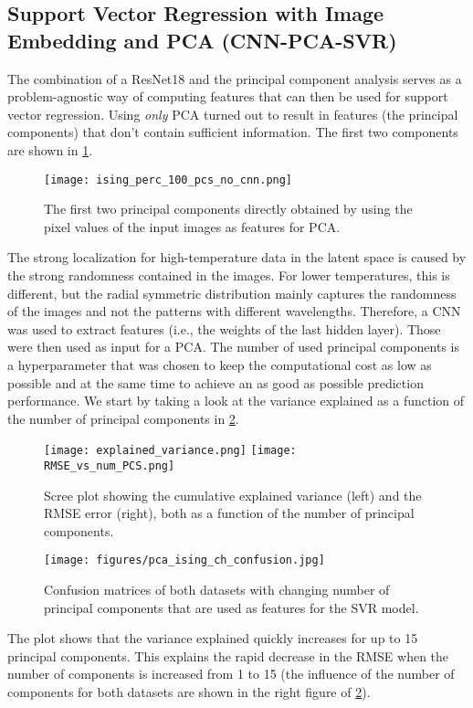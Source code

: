 \documentclass[11pt, authoryear]{elsarticle}
\begin{document}
\begin{appendix}
		\subsection{Support Vector Regression with Image Embedding and PCA (CNN-PCA-SVR)}
		The combination of a ResNet18 and the principal component analysis serves as a
		problem-agnostic way of computing features that can then be used for support 
		vector regression. Using \emph{only} PCA turned out to result in features
		(the principal components) that don't contain sufficient information. The
		first two components are shown in \cref{fig:ising_pcs_no_cnn}.
		\begin{figure}
			\centering
			\texttt{[image: ising\_perc\_100\_pcs\_no\_cnn.png]}
			\caption[]{%
				The first two principal components directly obtained by using the pixel values
				of the input images as features for PCA. 
			}
			\label{fig:ising_pcs_no_cnn}
		\end{figure}
		The strong localization for high-temperature data in the latent space
		is caused by the strong randomness contained in the images. For lower
		temperatures, this is different, but the radial symmetric distribution
		mainly captures the randomness of the images and not the patterns
		with different wavelengths. Therefore, a CNN was used to extract
		features (i.e., the weights of the last hidden layer). Those were
		then used as input for a PCA. The number of used principal components 
		is a hyperparameter that was chosen to keep the
		computational cost as low as possible and at the same time to achieve an 
		as good as possible prediction performance. We start by taking a look at the 
		variance explained as a function of the number of principal components in
		\cref{fig:exp_var}. 
		\begin{figure}
			\hbox{}\hfill
			\texttt{[image: explained\_variance.png]}
			\hfill
			\texttt{[image: RMSE\_vs\_num\_PCS.png]}
			\hfill\hbox{}
			\caption{Scree plot showing the cumulative explained variance (left) and the 
				RMSE error (right), both  as a function of the  number of principal components.
			}
			\label{fig:exp_var}
		\end{figure}
		\begin{figure}
			\centering
			\texttt{[image: figures/pca\_ising\_ch\_confusion.jpg]}
			\caption[]{%
				Confusion matrices of both datasets with changing number of principal components that are used as features for the SVR model.
			}
			\label{fig:pca_ising_ch_confusion}
		\end{figure}
		The plot shows that the variance explained quickly increases for up to 
		15 principal components. This explains the rapid decrease in the RMSE when 
		the number of components is increased from 1 to 15 (the influence of the 
		number of components for both datasets are shown in the right figure of
		\cref{fig:exp_var}). 
		

\end{appendix}
\end{document}
